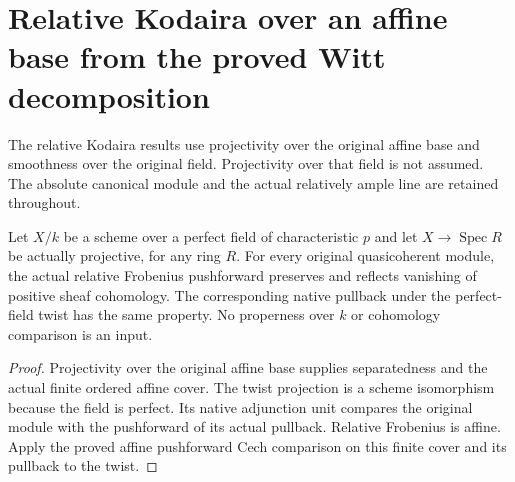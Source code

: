 \section{Relative Kodaira over an affine base from the proved Witt decomposition}

The relative Kodaira results use projectivity over the original affine base
and smoothness over the original field. Projectivity over that field is not
assumed. The absolute canonical module and the actual relatively ample line
are retained throughout.

\begin{lemma}
\label{lem:kn-relative-frobenius-native-cohomology}
\leanok
Let $X/k$ be a scheme over a perfect field of characteristic $p$ and let
$X\to\operatorname{Spec}R$ be actually projective, for any ring $R$.
For every original quasicoherent module, the actual relative Frobenius
pushforward preserves and reflects vanishing of positive sheaf cohomology.
The corresponding native pullback under the perfect-field twist has the same
property. No properness over $k$ or cohomology comparison is an input.
\end{lemma}
\begin{proof}
Projectivity over the original affine base supplies separatedness and the
actual finite ordered affine cover. The twist projection is a scheme
isomorphism because the field is perfect. Its native adjunction unit compares
the original module with the pushforward of its actual pullback. Relative
Frobenius is affine. Apply the proved affine pushforward Cech comparison on
this finite cover and its pullback to the twist.
\end{proof}

